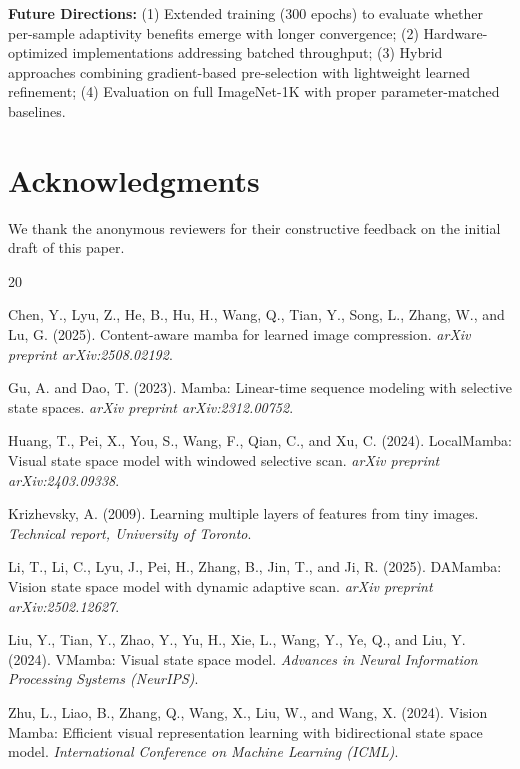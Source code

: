 \documentclass{article}
\begin{document}
\textbf{Future Directions:} (1) Extended training (300 epochs) to evaluate whether per-sample adaptivity benefits emerge with longer convergence; (2) Hardware-optimized implementations addressing batched throughput; (3) Hybrid approaches combining gradient-based pre-selection with lightweight learned refinement; (4) Evaluation on full ImageNet-1K with proper parameter-matched baselines.

\section*{Acknowledgments}

We thank the anonymous reviewers for their constructive feedback on the initial draft of this paper.

\begin{thebibliography}{20}

Chen, Y., Lyu, Z., He, B., Hu, H., Wang, Q., Tian, Y., Song, L., Zhang, W., and Lu, G.
(2025).
Content-aware mamba for learned image compression.
\emph{arXiv preprint arXiv:2508.02192}.

Gu, A. and Dao, T.
(2023).
Mamba: Linear-time sequence modeling with selective state spaces.
\emph{arXiv preprint arXiv:2312.00752}.

Huang, T., Pei, X., You, S., Wang, F., Qian, C., and Xu, C.
(2024).
LocalMamba: Visual state space model with windowed selective scan.
\emph{arXiv preprint arXiv:2403.09338}.

Krizhevsky, A.
(2009).
Learning multiple layers of features from tiny images.
\emph{Technical report, University of Toronto}.

Li, T., Li, C., Lyu, J., Pei, H., Zhang, B., Jin, T., and Ji, R.
(2025).
DAMamba: Vision state space model with dynamic adaptive scan.
\emph{arXiv preprint arXiv:2502.12627}.

Liu, Y., Tian, Y., Zhao, Y., Yu, H., Xie, L., Wang, Y., Ye, Q., and Liu, Y.
(2024).
VMamba: Visual state space model.
\emph{Advances in Neural Information Processing Systems (NeurIPS)}.

Zhu, L., Liao, B., Zhang, Q., Wang, X., Liu, W., and Wang, X.
(2024).
Vision Mamba: Efficient visual representation learning with bidirectional state space model.
\emph{International Conference on Machine Learning (ICML)}.

\end{thebibliography}
\end{document}
